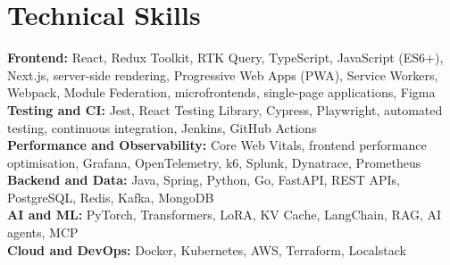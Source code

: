 \documentclass[a4paper,10pt]{article}
\newcommand{\skill}[2]{
  \textbf{#1:} #2
}
\begin{document}
\section{Technical Skills}
{\small
\skill{Frontend}{React, Redux Toolkit, RTK Query, TypeScript, JavaScript (ES6+), Next.js, server-side rendering, Progressive Web Apps (PWA), Service Workers, Webpack, Module Federation, microfrontends, single-page applications, Figma}\\
\skill{Testing and CI}{Jest, React Testing Library, Cypress, Playwright, automated testing, continuous integration, Jenkins, GitHub Actions}\\
\skill{Performance and Observability}{Core Web Vitals, frontend performance optimisation, Grafana, OpenTelemetry, k6, Splunk, Dynatrace, Prometheus}\\
\skill{Backend and Data}{Java, Spring, Python, Go, FastAPI, REST APIs, PostgreSQL, Redis, Kafka, MongoDB}\\
\skill{AI and ML}{PyTorch, Transformers, LoRA, KV Cache, LangChain, RAG, AI agents, MCP}\\
\skill{Cloud and DevOps}{Docker, Kubernetes, AWS, Terraform, Localstack}
}
\end{document}
